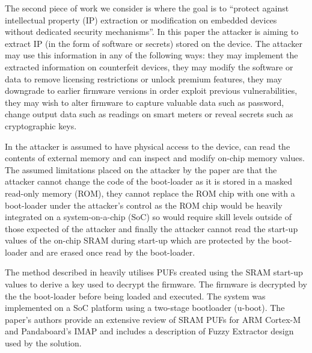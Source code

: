 The second piece of work we consider is \cite{Schaller2014} where the goal is to ``protect against intellectual property (IP) extraction or modification on embedded devices without dedicated security mechanisms''. In this paper the attacker is aiming to extract IP (in the form of software or secrets) stored on the device. The attacker may use this information in any of the following ways: they may implement the extracted information on counterfeit devices, they may modify the software or data to remove licensing restrictions or unlock premium features, they may downgrade to earlier firmware versions  in order exploit previous vulnerabilities, they may wish to alter firmware to capture valuable data such as password, change output data such as readings on smart meters or reveal secrets such as cryptographic keys.

\ifnotesincluded
{}
\fi

In \cite{Schaller2014} the attacker is assumed to have physical access to the device, can read the contents of external memory and can inspect and modify on-chip memory values. The assumed limitations placed on the attacker by the paper are that the attacker cannot change the code of the boot-loader as it is stored in a masked read-only memory (ROM), they cannot replace the ROM chip with one with a boot-loader under the attacker's control as the ROM chip would be heavily integrated on a system-on-a-chip (SoC) so would require skill levels outside of those expected of the attacker and finally the attacker cannot read the start-up values of the on-chip SRAM during start-up which are protected by the boot-loader and are erased once read by the boot-loader.

\ifnotesincluded
{}
\fi

The method described in \cite{Schaller2014} heavily utilises PUFs created using the SRAM start-up values to derive a key used to decrypt the firmware. The firmware is decrypted by the the boot-loader before being loaded and executed. The system was implemented on a SoC platform using a two-stage bootloader (u-boot). The paper's authors provide an extensive review of SRAM PUFs for ARM Cortex-M and Pandaboard's IMAP and includes a description of Fuzzy Extractor design used by the solution.

\ifnotesincluded
{}
\fi



